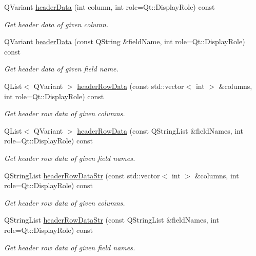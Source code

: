 \begin{DoxyCompactItemize}
Q\-Variant \hyperlink{classmdt_abstract_sql_table_controller_aae2c2912d99d33e6e0e3b010d218007f}{header\-Data} (int column, int role=Qt\-::\-Display\-Role) const 
\begin{DoxyCompactList}\small\item\em Get header data of given column. \end{DoxyCompactList}\item 
Q\-Variant \hyperlink{classmdt_abstract_sql_table_controller_a9b022656604a245f4517ed3a8df1ac37}{header\-Data} (const Q\-String \&field\-Name, int role=Qt\-::\-Display\-Role) const 
\begin{DoxyCompactList}\small\item\em Get header data of given field name. \end{DoxyCompactList}\item 
Q\-List$<$ Q\-Variant $>$ \hyperlink{classmdt_abstract_sql_table_controller_a99d93f6aa6b187dbe71056c768f687ed}{header\-Row\-Data} (const std\-::vector$<$ int $>$ \&columns, int role=Qt\-::\-Display\-Role) const 
\begin{DoxyCompactList}\small\item\em Get header row data of given columns. \end{DoxyCompactList}\item 
Q\-List$<$ Q\-Variant $>$ \hyperlink{classmdt_abstract_sql_table_controller_a7949939293b681a5c1abe28b3be7b42b}{header\-Row\-Data} (const Q\-String\-List \&field\-Names, int role=Qt\-::\-Display\-Role) const 
\begin{DoxyCompactList}\small\item\em Get header row data of given field names. \end{DoxyCompactList}\item 
Q\-String\-List \hyperlink{classmdt_abstract_sql_table_controller_a5eddd16842159a785a97f57c72a01eaf}{header\-Row\-Data\-Str} (const std\-::vector$<$ int $>$ \&columns, int role=Qt\-::\-Display\-Role) const 
\begin{DoxyCompactList}\small\item\em Get header row data of given columns. \end{DoxyCompactList}\item 
Q\-String\-List \hyperlink{classmdt_abstract_sql_table_controller_a1487fbe6b3fb519c03fc2701ee68d116}{header\-Row\-Data\-Str} (const Q\-String\-List \&field\-Names, int role=Qt\-::\-Display\-Role) const 
\begin{DoxyCompactList}\small\item\em Get header row data of given field names. \end{DoxyCompactList}\item 

\end{DoxyCompactItemize}
